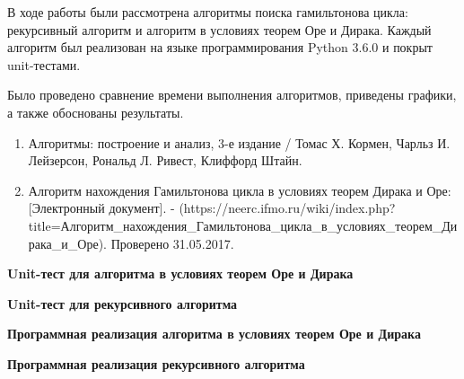 \newpage


В ходе работы были рассмотрена алгоритмы поиска гамильтонова цикла: рекурсивный алгоритм и алгоритм в условиях теорем Оре и Дирака.
Каждый алгоритм был реализован на языке программирования Python 3.6.0 и покрыт unit-тестами.

Было проведено сравнение времени выполнения алгоритмов, приведены графики, а также обоснованы результаты.

\newpage


\begin{enumerate}

    \item Алгоритмы: построение и анализ, 3-е издание / Томас Х. Кормен, Чарльз И. Лейзерсон, Рональд Л. Ривест, Клиффорд Штайн.

    \item Алгоритм нахождения Гамильтонова цикла в условиях теорем Дирака и Оре:
    [Электронный документ].
    - (https://neerc.ifmo.ru/wiki/index.php?title=Алгоритм\_нахождения\-\_Гамильтонова\_цикла\_в\_условиях\_теорем\_Дирака\_и\_Оре).
    Проверено 31.05.2017.

\end{enumerate}

\newpage

{\bf {\hfil{Unit-тест для алгоритма в условиях теорем Оре и Дирака}}}\\[0.3cm]


\newpage

{\hfil \bf {{Unit-тест для рекурсивного алгоритма}}}\\[0.3cm]


\newpage

{\bf {\hfil{Программная реализация алгоритма в условиях теорем Оре и Дирака}}}\\[0.3cm]


\newpage

{\bf {\hfil{Программная реализация рекурсивного алгоритма}\hfil}}\\[0.3cm]


\newpage

